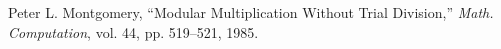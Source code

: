 \begin{thebibliography}{99} %
Peter L. Montgomery, ``Modular Multiplication Without Trial Division,'' \emph{Math. Computation}, vol. 44, pp. 519--521, 1985.
\end{thebibliography}